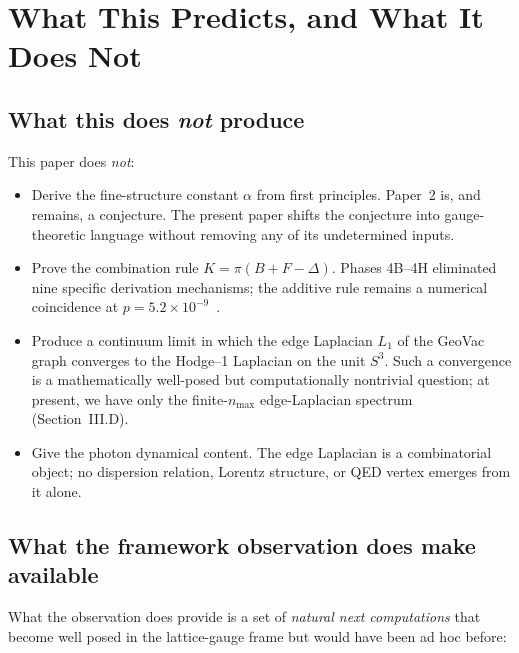 \documentclass[aps,pra,twocolumn,superscriptaddress,longbibliography]{revtex4-2}
\begin{document}

\section{What This Predicts, and What It Does Not}
\label{sec:predictions}

\subsection{What this does \emph{not} produce}

This paper does \emph{not}:
\begin{itemize}
\item Derive the fine-structure constant $\alpha$ from first
  principles.  Paper~2 is, and remains, a conjecture.  The present
  paper shifts the conjecture into gauge-theoretic language without
  removing any of its undetermined inputs.
\item Prove the combination rule $K = \pi(B + F - \Delta)$.  Phases
  4B--4H eliminated nine specific derivation mechanisms; the
  additive rule remains a numerical coincidence at $p = 5.2 \times
  10^{-9}$~\cite{Paper2}.
\item Produce a continuum limit in which the edge Laplacian
  $L_1$ of the GeoVac graph converges to the Hodge--1 Laplacian on
  the unit $S^3$.  Such a convergence is a mathematically
  well-posed but computationally nontrivial question; at present, we
  have only the finite-$n_{\max}$ edge-Laplacian spectrum
  (Section~III.D).
\item Give the photon dynamical content.  The edge Laplacian is a
  combinatorial object; no dispersion relation, Lorentz structure,
  or QED vertex emerges from it alone.
\end{itemize}

\subsection{What the framework observation does make available}

What the observation does provide is a set of \emph{natural next
computations} that become well posed in the lattice-gauge frame but
would have been ad hoc before:
\end{document}
